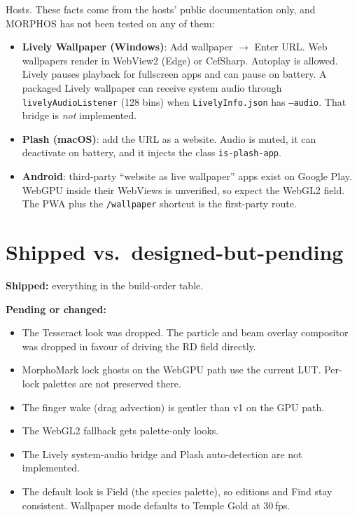 \documentclass[10pt,a4paper]{article}
\newcommand{\code}[1]{\texttt{\small #1}}
\begin{document}
Hosts. These facts come from the hosts' public documentation only, and MORPHOS has not been tested on any of them:
\begin{itemize}
\item \textbf{Lively Wallpaper (Windows)}: Add wallpaper $\to$ Enter URL. Web wallpapers render in WebView2 (Edge) or CefSharp. Autoplay is
allowed. Lively pauses playback for fullscreen apps and can pause on battery. A packaged Lively wallpaper can receive system audio
through \code{livelyAudioListener} (128 bins) when \code{LivelyInfo.json} has \code{--audio}. That bridge is \emph{not} implemented.
\item \textbf{Plash (macOS)}: add the URL as a website. Audio is muted, it can deactivate on battery, and it injects the class \code{is-plash-app}.
\item \textbf{Android}: third-party ``website as live wallpaper'' apps exist on Google Play. WebGPU inside their WebViews is unverified,
so expect the WebGL2 field. The PWA plus the \code{/wallpaper} shortcut is the first-party route.
\end{itemize}

\section{Shipped vs.\ designed-but-pending}
\textbf{Shipped:} everything in the build-order table.

\noindent\textbf{Pending or changed:}
\begin{itemize}
\item The Tesseract look was dropped. The particle and beam overlay compositor was dropped in favour of driving the RD field directly.
\item MorphoMark lock ghosts on the WebGPU path use the current LUT. Per-lock palettes are not preserved there.
\item The finger wake (drag advection) is gentler than v1 on the GPU path.
\item The WebGL2 fallback gets palette-only looks.
\item The Lively system-audio bridge and Plash auto-detection are not implemented.
\item The default look is Field (the species palette), so editions and Find stay consistent. Wallpaper mode defaults to Temple Gold at 30\,fps.
\end{itemize}

\end{document}
